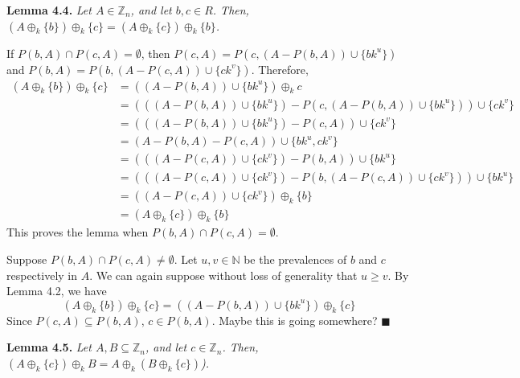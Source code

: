 \documentclass{article}
\newcommand{\zee}{\mathbb{Z}}
\newcommand{\N}{\mathbb{N}}
\begin{document}
\newpage
\textbf{Lemma 4.4.} \textit{Let $A \in \zee_n$, and let $b, c \in R$.
Then,
$(A \oplus_k \{b\}) \oplus_k \{c\}
= (A \oplus_k \{c\}) \oplus_k \{b\}$.}

If $P(b, A) \cap P(c, A) = \emptyset$, then
$P(c, A) = P(c, (A - P(b, A)) \cup \{bk^u\})$
and $P(b, A) = P(b, (A - P(c, A)) \cup \{ck^v\})$. Therefore,
\[\begin{split}
    (A \oplus_k \{b\}) \oplus_k \{c\}
    &= ((A - P(b, A)) \cup \{bk^u\}) \oplus_k c \\
    &= (((A - P(b, A)) \cup \{bk^u\})
        - P(c, (A - P(b, A)) \cup \{bk^u\})) \cup \{ck^v\} \\
    &= (((A - P(b, A)) \cup \{bk^u\}) - P(c, A)) \cup \{ck^v\} \\
    &= (A - P(b, A) - P(c, A)) \cup \{bk^u, ck^v\} \\
    &= (((A - P(c, A)) \cup \{ck^v\}) - P(b, A)) \cup \{bk^u\} \\
    &= (((A - P(c, A)) \cup \{ck^v\})
        - P(b, (A - P(c, A)) \cup \{ck^v\})) \cup \{bk^u\} \\
    &= ((A - P(c, A)) \cup \{ck^v\}) \oplus_k \{b\} \\
    &= (A \oplus_k \{c\}) \oplus_k \{b\}
\end{split}\]
This proves the lemma when $P(b, A) \cap P(c, A) = \emptyset$.

Suppose $P(b, A) \cap P(c, A) \neq \emptyset$.
Let $u, v \in \N$ be the prevalences of $b$ and $c$ respectively in $A$.
We can again suppose without loss of generality that $u \geq v$.
By Lemma 4.2, we have
\[(A \oplus_k \{b\}) \oplus_k \{c\}
= ((A - P(b, A)) \cup \{bk^u\}) \oplus_k \{c\}\]
Since $P(c, A) \subseteq P(b, A)$, $c \in P(b, A)$.
Maybe this is going somewhere? $\blacksquare$

\textbf{Lemma 4.5.} \textit{Let $A, B \subseteq \zee_n$,
and let $c \in \zee_n$. Then,
$(A \oplus_k \{c\}) \oplus_k B = A \oplus_k (B \oplus_k \{c\})$).}
\end{document}
